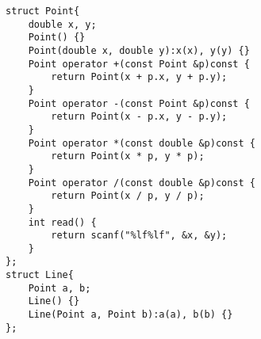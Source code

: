 \begin{lstlisting}
struct Point{
	double x, y;
	Point() {}
	Point(double x, double y):x(x), y(y) {}
	Point operator +(const Point &p)const {
		return Point(x + p.x, y + p.y);
	}
	Point operator -(const Point &p)const {
		return Point(x - p.x, y - p.y);
	}
	Point operator *(const double &p)const {
		return Point(x * p, y * p);
	}
	Point operator /(const double &p)const {
		return Point(x / p, y / p);
	}
	int read() {
		return scanf("%lf%lf", &x, &y);
	}
};
struct Line{
	Point a, b;
	Line() {}
	Line(Point a, Point b):a(a), b(b) {}
};
\end{lstlisting}
